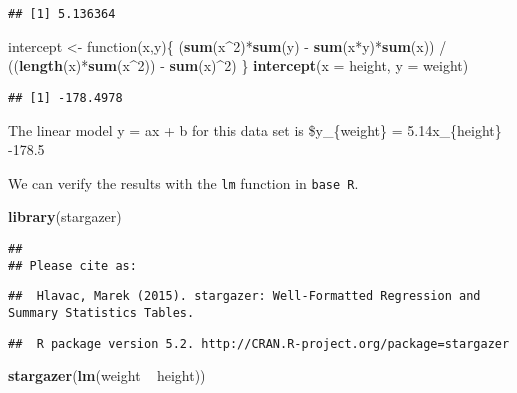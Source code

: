 \documentclass[]{article}
\newenvironment{Shaded}{\begin{snugshade}}{\end{snugshade}}
\newcommand{\KeywordTok}[1]{\textcolor[rgb]{0.13,0.29,0.53}{\textbf{{#1}}}}
\newcommand{\DataTypeTok}[1]{\textcolor[rgb]{0.13,0.29,0.53}{{#1}}}
\newcommand{\DecValTok}[1]{\textcolor[rgb]{0.00,0.00,0.81}{{#1}}}
\newcommand{\StringTok}[1]{\textcolor[rgb]{0.31,0.60,0.02}{{#1}}}
\newcommand{\NormalTok}[1]{{#1}}
\begin{document}
\begin{verbatim}
## [1] 5.136364
\end{verbatim}

\begin{Shaded}
\begin{Highlighting}[]
\NormalTok{intercept <-}\StringTok{ }\NormalTok{function(x,y)\{}
  \NormalTok{(}\KeywordTok{sum}\NormalTok{(x^}\DecValTok{2}\NormalTok{)*}\KeywordTok{sum}\NormalTok{(y) -}\StringTok{ }\KeywordTok{sum}\NormalTok{(x*y)*}\KeywordTok{sum}\NormalTok{(x)) /}
\StringTok{  }\NormalTok{((}\KeywordTok{length}\NormalTok{(x)*}\KeywordTok{sum}\NormalTok{(x^}\DecValTok{2}\NormalTok{)) -}\StringTok{ }\KeywordTok{sum}\NormalTok{(x)^}\DecValTok{2}\NormalTok{)}
\NormalTok{\}}
\KeywordTok{intercept}\NormalTok{(}\DataTypeTok{x =} \NormalTok{height, }\DataTypeTok{y =} \NormalTok{weight)}
\end{Highlighting}
\end{Shaded}

\begin{verbatim}
## [1] -178.4978
\end{verbatim}

The linear model y = ax + b for this data set is \$y\_\{weight\} =
5.14x\_\{height\} -178.5

We can verify the results with the \texttt{lm} function in
\texttt{base\ R}.

\begin{Shaded}
\begin{Highlighting}[]
\KeywordTok{library}\NormalTok{(stargazer)}
\end{Highlighting}
\end{Shaded}

\begin{verbatim}
## 
## Please cite as:
\end{verbatim}

\begin{verbatim}
##  Hlavac, Marek (2015). stargazer: Well-Formatted Regression and Summary Statistics Tables.
\end{verbatim}

\begin{verbatim}
##  R package version 5.2. http://CRAN.R-project.org/package=stargazer
\end{verbatim}

\begin{Shaded}
\begin{Highlighting}[]
\KeywordTok{stargazer}\NormalTok{(}\KeywordTok{lm}\NormalTok{(weight ~}\StringTok{ }\NormalTok{height))}
\end{Highlighting}
\end{Shaded}
\end{document}
